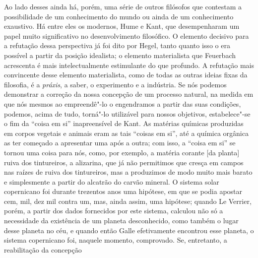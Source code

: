 Ao lado desses ainda há, porém, uma série de outros filósofos que
contestam a possibilidade de um conhecimento do mundo ou ainda de um
conhecimento exaustivo. Há entre eles os
modernos, Hume e Kant,
que desempenharam um papel muito significativo no desenvolvimento
filosófico. O elemento decisivo para a refutação dessa perspectiva já foi
dito por Hegel, tanto quanto isso o era possível a partir da posição
idealista; o elemento materialista
que Feuerbach acrescenta
é mais intelectualmente estimulante do que profundo. A refutação mais
convincente desse elemento materialista, como de todas as outras ideias fixas
da filosofia, é a \emph{práxis}, a saber, o 
experimento e a indústria. Se nós podemos demonstrar a correção da nossa
concepção de um processo natural, na medida em que nós mesmos ao
empreendê"-lo o engendramos a partir das suas condições, podemos, acima
de tudo, torná"-lo utilizável para nossos objetivos, estabelece"-se o fim
da ``coisa em si'' inapreensível
de Kant.
As matérias químicas produzidas em corpos vegetais e animais eram as
tais ``coisas em si'', até a química orgânica as ter começado a
apresentar uma após a outra; com isso, a ``coisa em si'' se tornou uma
coisa para nós, como, por exemplo, a matéria corante {[}da planta{]}
ruiva dos tintureiros, a alizarina, que já não permitimos que cresça em
campos nas raízes de ruiva dos tintureiros, mas a produzimos de modo
muito mais barato e simplesmente a partir do alcatrão do carvão mineral.
O sistema solar copernicano foi durante trezentos anos uma hipótese, em
que se podia apostar cem, mil, dez mil contra um, mas, ainda assim, uma
hipótese; quando Le Verrier, porém, a partir dos dados fornecidos por
este sistema, calculou não só a necessidade da existência de um planeta
desconhecido, como também o lugar desse planeta no céu, e quando então
Galle efetivamente encontrou esse planeta,
o sistema copernicano foi, naquele momento, comprovado. Se, entretanto, a reabilitação da concepção
